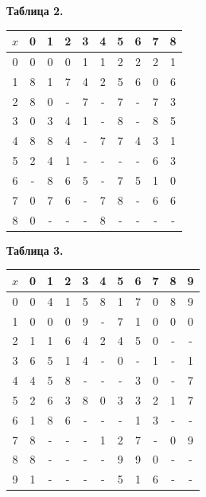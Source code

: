 \documentclass[oneside,final,14pt]{extreport}
\begin{document}
\centerline{\bf Таблица 2.}
\begin{center}
\begin{tabular}{|c|c|c|c|c|c|c|c|c|c|}
\hline \(x\) & 0 & 1 & 2 & 3 & 4 & 5 & 6 & 7 & 8 \\ \hline
0 & 0 & 0 & 0 & 1 & 1 & 2 & 2 & 2 & 1 \\ \hline 
1 & 8 & 1 & 7 & 4 & 2 & 5 & 6 & 0 & 6 \\ \hline
2 & 8 & 0 & - & 7 & - & 7 & - & 7 & 3 \\ \hline
3 & 0 & 3 & 4 & 1 & - & 8 & - & 8 & 5 \\ \hline
4 & 8 & 8 & 4 & - & 7 & 7 & 4 & 3 & 1 \\ \hline
5 & 2 & 4 & 1 & - & - & - & - & 6 & 3 \\ \hline
6 & - & 8 & 6 & 5 & - & 7 & 5 & 1 & 0 \\ \hline
7 & 0 & 7 & 6 & - & 7 & 8 & - & 6 & 6 \\ \hline
8 & 0 & - & - & - & 8 & - & - & - & - \\ \hline
\end{tabular}
\end{center}


\centerline{\bf Таблица 3.}
\begin{center}
\begin{tabular}{|c|c|c|c|c|c|c|c|c|c|c|}
\hline \(x\) & 0 & 1 & 2 & 3 & 4 & 5 & 6 & 7 & 8 & 9 \\ \hline
0 & 0 & 4 & 1 & 5 & 8 & 1 & 7 & 0 & 8 & 9 \\ \hline 
1 & 0 & 0 & 0 & 9 & - & 7 & 1 & 0 & 0 & 0 \\ \hline 
2 & 1 & 1 & 6 & 4 & 2 & 4 & 5 & 0 & - & - \\ \hline 
3 & 6 & 5 & 1 & 4 & - & 0 & - & 1 & - & 1 \\ \hline 
4 & 4 & 5 & 8 & - & - & - & 3 & 0 & - & 7 \\ \hline 
5 & 2 & 6 & 3 & 8 & 0 & 3 & 3 & 2 & 1 & 7 \\ \hline 
6 & 1 & 8 & 6 & - & - & - & 1 & 3 & - & - \\ \hline 
7 & 8 & - & - & - & 1 & 2 & 7 & - & 0 & 9 \\ \hline 
8 & 8 & - & - & - & - & 9 & 9 & 0 & - & - \\ \hline 
9 & 1 & - & - & - & - & 5 & 1 & 6 & - & - \\ \hline 
\end{tabular}
\end{center}
\end{document}
